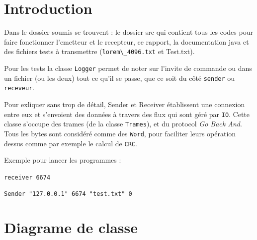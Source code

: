 \documentclass{article}
\begin{document}
\section{Introduction}

Dans le dossier soumis se trouvent : le dossier src qui contient tous les codes pour faire fonctionner l'emetteur et le recepteur, ce rapport, la documentation java et des fichiers tests à transmettre (\verb#lorem\_4096.txt# et Test.txt).

\hfill

Pour les tests la classe \verb#Logger# permet de noter sur l'invite de commande ou dans un fichier (ou les deux) tout ce qu'il se passe, que ce soit du côté \verb#sender# ou \verb#receveur#.

\hfill

Pour exliquer sans trop de détail, Sender et Receiver établissent une connexion entre eux et s'envoient des données à travers des flux qui sont géré par \verb#IO#. Cette classe s'occupe des trames (de la classe \verb#Trames#), et du protocol \emph{Go Back And}. Tous les bytes sont considéré comme des \verb#Word#, pour faciliter leurs opération dessus comme par exemple le calcul de \verb#CRC#.

\hfill

\hfill

Exemple pour lancer les programmes :

\hfill

\verb#receiver 6674#

\hfill

\verb#Sender "127.0.0.1" 6674 "test.txt" 0#

\clearpage

\section{Diagrame de classe}
\end{document}
